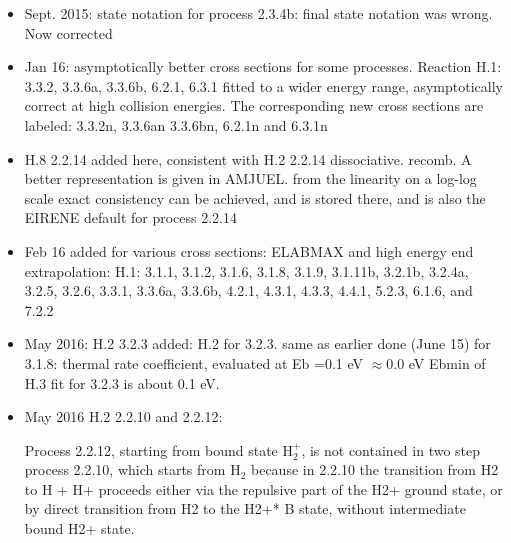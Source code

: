 \documentclass[12pt,dvipdfm]{article}
\begin{document}
\begin{itemize}
\item{Sept. 2015: state notation for process 2.3.4b: final state notation was wrong.}
Now corrected

\item{Jan 16: asymptotically better cross sections for some processes.}
Reaction H.1:  3.3.2,  3.3.6a,  3.3.6b, 6.2.1,  6.3.1  fitted to a wider energy range, asymptotically correct
at high collision energies.
The corresponding new cross sections are labeled: 3.3.2n, 3.3.6an 3.3.6bn, 6.2.1n and 6.3.1n

\item{H.8  2.2.14 added here, consistent with H.2 2.2.14 dissociative. recomb.}
A better representation is given in AMJUEL. from the linearity on a log-log scale exact consistency
can be achieved, and is stored there, and is also the EIRENE default for process 2.2.14

\item{Feb 16 added for various cross sections: ELABMAX and high energy end extrapolation:
H.1:  3.1.1, 3.1.2, 3.1.6, 3.1.8, 3.1.9, 3.1.11b, 3.2.1b, 3.2.4a, 3.2.5, 3.2.6, 3.3.1, 3.3.6a, 3.3.6b,
4.2.1, 4.3.1, 4.3.3,  4.4.1, 5.2.3, 6.1.6, and 7.2.2}

\item{May 2016: H.2  3.2.3}
added: H.2 for 3.2.3. same as earlier done (June 15) for 3.1.8: thermal rate coefficient, evaluated at Eb =0.1 eV $\approx 0.0$ eV
Ebmin of H.3 fit for 3.2.3 is about 0.1 eV.

\item{May 2016 H.2 2.2.10 and 2.2.12:}

Process 2.2.12, starting from bound state H$_2^+$, is not contained in two step process 2.2.10,
which starts from H$_2$
because in 2.2.10 the transition from H2 to H + H+ proceeds either via the repulsive part
of the H2+ ground state,
or by direct transition from H2 to the H2+*  B state, without intermediate bound H2+ state.
\end{itemize}
\end{document}
